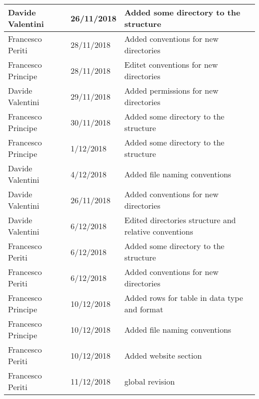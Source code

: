 \begin{table}[H]
\begin{tabularx}{\textwidth}{|l|l|X|}
Davide Valentini & 26/11/2018 & Added some directory to the structure\\ \hline
Francesco Periti & 28/11/2018 & Added conventions for new directories\\ \hline
Francesco Principe & 28/11/2018 & Editet conventions for new directories\\ \hline
Davide Valentini & 29/11/2018 & Added permissions for new directories\\ \hline
Francesco Principe & 30/11/2018 & Added some directory to the structure\\ \hline
Francesco Principe & 1/12/2018 & Added some directory to the structure\\ \hline
Davide Valentini & 4/12/2018 & Added file naming conventions\\ \hline
Davide Valentini & 26/11/2018 & Added conventions for new directories\\ \hline
Davide Valentini & 6/12/2018 & Edited directories structure and relative conventions\\ \hline
Francesco Periti & 6/12/2018 & Added some directory to the structure\\ \hline
Francesco Periti & 6/12/2018 & Added conventions for new directories\\ \hline
Francesco Principe & 10/12/2018 &  Added rows for table in data type and format\\ \hline
Francesco Principe & 10/12/2018 & Added file naming conventions\\ \hline
Francesco Periti & 10/12/2018 & Added website section\\ \hline
Francesco Periti & 11/12/2018 & global revision\\ \hline

\end{tabularx}
\end{table}
